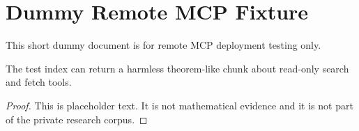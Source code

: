 \section{Dummy Remote MCP Fixture}

This short dummy document is for remote MCP deployment testing only.

\begin{theorem}
The test index can return a harmless theorem-like chunk about read-only search and fetch tools.
\end{theorem}

\begin{proof}
This is placeholder text. It is not mathematical evidence and it is not part of the private research corpus.
\end{proof}
